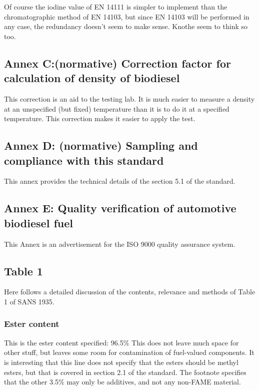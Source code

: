 Of course the iodine value of EN 14111 is simpler to implement than the chromatographic method of EN 14103, but since EN 14103 will be performed in any case, the redundancy doesn't seem to make sense. Knothe \cite{} seem to think so too.

\subsection{Annex C:(normative) Correction factor for calculation of density of biodiesel}

This correction is an aid to the testing lab. It is much easier to measure a density at an unspecified (but fixed) temperature than it is to do it at a specified temperature. This correction makes it easier to apply the test.

\subsection{Annex D: (normative) Sampling and compliance with this standard}

This annex provides the technical details of the section 5.1 of the standard.

\subsection{Annex E: Quality verification of automotive biodiesel fuel}

This Annex is an advertisement for the ISO 9000 quality assurance system.

\subsection{Table 1}

Here follows a detailed discussion of the contents, relevance and methods of Table 1 of SANS 1935.
\label{table1}
\subsubsection{Ester content}

This is the ester content specified: 96.5\% This does not leave much space for other stuff, but leaves some room for contamination of fuel-valued components. It is interesting that this line does not specify that the esters should be methyl esters, but that is covered in section 2.1 of the standard. The footnote specifies that the other 3.5\% may only be additives, and not any non-FAME material.

